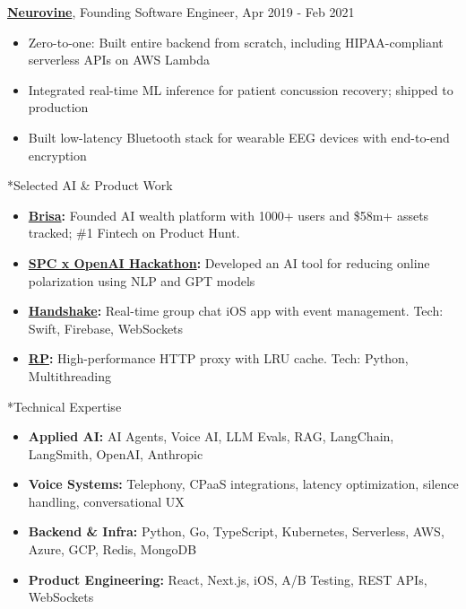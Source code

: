 \documentclass[10pt]{article}
\makeatletter
\renewcommand\section{\@startsection{section}{1}{0pt}{1.5ex}{1ex}{\normalfont\large\bfseries}}
\makeatother
\begin{document}
\noindent
\textbf{\href{https://neurovine.ai}{Neurovine}}, Founding Software Engineer, Apr 2019 - Feb 2021
\begin{itemize}
    \setlength\itemsep{0em}
    \item Zero-to-one: Built entire backend from scratch, including HIPAA-compliant serverless APIs on AWS Lambda
    \item Integrated real-time ML inference for patient concussion recovery; shipped to production
    \item Built low-latency Bluetooth stack for wearable EEG devices with end-to-end encryption
\end{itemize}

\section*{Selected AI \& Product Work}

\begin{itemize}
    \setlength\itemsep{0em}
    \item \textbf{\href{https://joinbrisa.com}{Brisa}:} Founded AI wealth platform with 1000+ users and \$58m+ assets tracked; \#1 Fintech on Product Hunt.
    \item \textbf{\href{https://x.com/tomas_hk/status/1764725667130991022}{SPC x OpenAI Hackathon}:} Developed an AI tool for reducing online polarization using NLP and GPT models
    \item \textbf{\href{https://github.com/boshd/handshake}{Handshake}:} Real-time group chat iOS app with event management. Tech: Swift, Firebase, WebSockets
    \item \textbf{\href{https://github.com/boshd/rp}{RP}:} High-performance HTTP proxy with LRU cache. Tech: Python, Multithreading
\end{itemize}

\section*{Technical Expertise}
\begin{itemize}
    \setlength\itemsep{0em}
    \item \textbf{Applied AI:} AI Agents, Voice AI, LLM Evals, RAG, LangChain, LangSmith, OpenAI, Anthropic
    \item \textbf{Voice Systems:} Telephony, CPaaS integrations, latency optimization, silence handling, conversational UX
    \item \textbf{Backend \& Infra:} Python, Go, TypeScript, Kubernetes, Serverless, AWS, Azure, GCP, Redis, MongoDB
    \item \textbf{Product Engineering:} React, Next.js, iOS, A/B Testing, REST APIs, WebSockets
\end{itemize}
\end{document}
